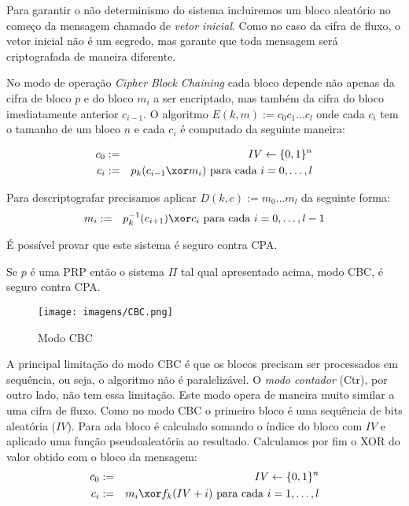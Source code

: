 Para garantir o não determinismo do sistema incluiremos um bloco aleatório no começo da mensagem chamado de {\em vetor inicial}.
Como no caso da cifra de fluxo, o vetor inicial não é um segredo, mas garante que toda mensagem será criptografada de maneira diferente.

No modo de operação {\em Cipher Block Chaining} cada bloco depende não apenas da cifra de bloco $p$ e do bloco $m_i$ a ser encriptado, mas também da cifra do bloco imediatamente anterior $c_{i-1}$.
O algoritmo $E(k,m) := c_0 c_1 \dots c_l$ onde cada $c_i$ tem o tamanho de um bloco $n$ e cada $c_i$ é computado da seguinte maneira:

\begin{eqnarray*}
  c_0 & := & IV \leftarrow \{0,1\}^n \\
  c_i & := & p_k(c_{i-1} \xor m_i) \textrm{ para cada } i = 0, \dots, l
\end{eqnarray*}

Para descriptografar precisamos aplicar $D(k,c) := m_0 \dots m_l$ da seguinte forma:
\begin{eqnarray*}
  m_{i} & := & p_k^{-1}(c_{i+1}) \xor c_{i} \textrm{ para cada } i = 0, \dots, l-1
\end{eqnarray*}

É possível provar que este sistema é seguro contra CPA.

\begin{theorem}
  Se $p$ é uma PRP então o sistema $\Pi$ tal qual apresentado acima, modo CBC, é seguro contra CPA.
\end{theorem}

\begin{figure}[!htp]
  \centering
  \texttt{[image: imagens/CBC.png]}
  \caption{Modo CBC}
\end{figure}


A principal limitação do modo CBC é que os blocos precisam ser processados em sequência, ou seja, o algoritmo não é paralelizável.
O {\em modo contador} (Ctr), por outro lado, não tem essa limitação.
Este modo opera de maneira muito similar a uma cifra de fluxo.
Como no modo CBC o primeiro bloco é uma sequência de bits aleatória ($IV$).
Para ada bloco é calculado somando o índice do bloco com $IV$ e aplicado uma função pseudoaleatória ao resultado.
Calculamos por fim o XOR do valor obtido com o bloco da mensagem:
\begin{eqnarray*}
  c_0 & := & IV \leftarrow \{0,1\}^n \\
  c_i & := & m_i \xor f_k(IV + i) \textrm{ para cada } i = 1, \dots, l
\end{eqnarray*} 

